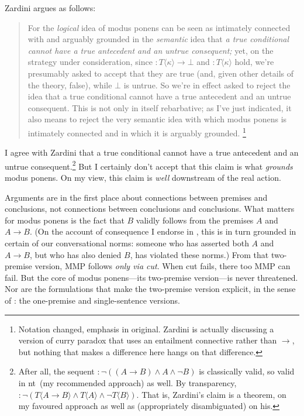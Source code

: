 \documentclass{ergoclass}
\newcommand{\sqq}[2]{\ensuremath{#1  \mathrel{:}  #2}}
\newcommand{\Tname}[1]{\T\name{#1}}
\newcommand{\name}[1]{\ensuremath{\langle #1 \rangle}}
\newcommand{\amcond}{\ensuremath{\rightarrow}}
\newcommand{\amand}{\ensuremath{\wedge}}
\newcommand{\T}{\ensuremath{T}}
\newcommand{\curry}{\ensuremath{\kappa}}
\newcommand{\ntlog}{{\sc nt}}
\renewcommand{\cite}{\citet}						%
\begin{document}
Zardini argues as follows: 

\begin{quote}
For the {\em logical} idea of modus ponens can be seen as intimately connected with and arguably grounded in the {\em semantic} idea that {\em a true conditional cannot have a true antecedent and an untrue consequent;} yet, on the strategy under consideration, since $\sqq{}{\Tname{\curry} \amcond \bot}$ and $\sqq{}{\Tname{\curry}}$ hold, we're presumably asked to accept that they are true (and, given other details of the theory, false), while $\bot$ is untrue. So we're in effect asked to reject the idea that a true conditional cannot have a true antecedent and an untrue consequent. This is not only in itself rebarbative; as I've just indicated, it also means to reject the very semantic idea with which modus ponens is intimately connected and in which it is arguably grounded. \citeyearpar[579]{zardini:nmp}\footnote{Notation changed, emphasis in original. Zardini is actually discussing a version of curry paradox that uses an entailment connective rather than $\amcond$, but nothing that makes a difference here hangs on that difference.} 
\end{quote}

I agree with Zardini that a true conditional cannot have a true antecedent and an untrue consequent.\footnote{After all, the sequent $\sqq{}{\neg ((A \amcond B) \amand A \amand \neg B)}$ is classically valid, so valid in \ntlog\ (my recommended approach) as well. By transparency, $\sqq{}{\neg (\Tname{A \amcond B} \amand \Tname{A} \amand \neg \Tname{B})}$. That is, Zardini's claim is a theorem, on my favoured approach as well as (appropriately disambiguated) on his.} But I certainly don't accept that this claim is what {\em grounds} modus ponens. On my view, this claim is {\em well} downstream of the real action.

Arguments are in the first place about connections between premises and conclusions, not connections between conclusions and conclusions. What matters for modus ponens is the fact that $B$ validly follows from the premises $A$ and $A \amcond B$. (On the account of consequence I endorse in \cite{ripley:pafc}, this is in turn grounded in certain of our conversational norms: someone who has asserted both $A$ and $A \amcond B$, but who has also denied $B$, has violated these norms.) From that two-premise version, MMP follows {\em only via cut}. When cut fails, there too MMP can fail. But the core of modus ponens---its two-premise version---is never threatened. Nor are the formulations that make the two-premise version explicit, in the sense of \cite{brandom:mie}: the one-premise and single-sentence versions. 
\end{document}
